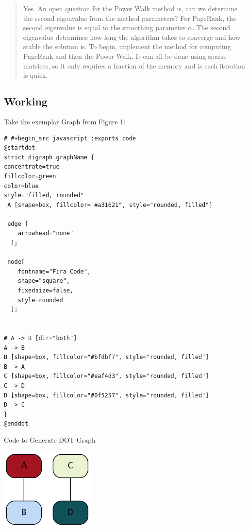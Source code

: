 \documentclass[11pt]{article}
\begin{document}
\begin{quote}
Yes. An open question for the Power Walk method is, can we determine the second
eigenvalue from the method parameters? For PageRank, the second eigenvalue is
equal to the smoothing parameter \(\alpha\). The second eigenvalue determines how
long the algorithm takes to converge and how stable the solution is. To begin,
implement the method for computing PageRank and then the Power Walk. It can all
be done using sparse matrices, so it only requires a fraction of the memory and
is each iteration is quick.
\end{quote}

\subsection{Working}
\label{sec:orgf55dfe5}

Take the exemplar Graph from Figure 1:


\begin{listing}[htbp]
\begin{verbatim}
# #+begin_src javascript :exports code
@startdot
strict digraph graphName {
concentrate=true
fillcolor=green
color=blue
style="filled, rounded"
 A [shape=box, fillcolor="#a31621", style="rounded, filled"]

 edge [
    arrowhead="none"
  ];

 node[
    fontname="Fira Code",
    shape="square",
    fixedsize=false,
    style=rounded
  ];


# A -> B [dir="both"]
A -> B
B [shape=box, fillcolor="#bfdbf7", style="rounded, filled"]
B -> A
C [shape=box, fillcolor="#eaf4d3", style="rounded, filled"]
C -> D
D [shape=box, fillcolor="#0f5257", style="rounded, filled"]
D -> C
}
@enddot
\end{verbatim}
\caption{\label{DotLib}Code to Generate DOT Graph}
\end{listing}

\begin{center}
\includegraphics[width=.9\linewidth]{./Media/Example.png}
\end{center}
\end{document}
